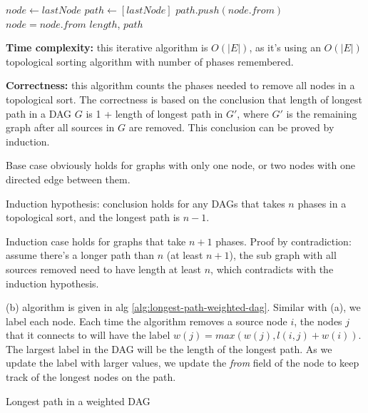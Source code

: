 \documentclass{article}
\begin{document}
\begin{description}
\begin{algorithm}[h]
\begin{algorithmic}[1]
      \State $node \gets lastNode$
      \State $path \gets [lastNode]$
        \State $path.push(node.from)$
        \State $node = node.from$
      \EndWhile
      \State \Return $length$, $path$
    \EndFunction
    
    \end{algorithmic}
  \end{algorithm}

  \textbf{Time complexity:} this iterative algorithm is $O(|E|)$, as it's using an $O(|E|)$ topological sorting algorithm with number of phases remembered. 

  \textbf{Correctness:} this algorithm counts the phases needed to remove all nodes in a topological sort. The correctness is based on the conclusion that length of longest path in a DAG $G$ is 1 + length of longest path in $G'$, where $G'$ is the remaining graph after all sources in $G$ are removed. This conclusion can be proved by induction.

  Base case obviously holds for graphs with only one node, or two nodes with one directed edge between them.

  Induction hypothesis: conclusion holds for any DAGs that takes $n$ phases in a topological sort, and the longest path is $n-1$.

  Induction case holds for graphs that take $n+1$ phases. Proof by contradiction: assume there's a longer path than $n$ (at least $n+1$), the sub graph with all sources removed need to have length at least $n$, which contradicts with the induction hypothesis.

  (b) algorithm is given in alg \ref{alg:longest-path-weighted-dag}. Similar with (a), we label each node. Each time the algorithm removes a source node $i$, the nodes $j$ that it connects to will have the label $w(j) = max(w(j), l(i,j) + w(i))$. The largest label in the DAG will be the length of the longest path. As we update the label with larger values, we update the \textit{from} field of the node to keep track of the longest nodes on the path.

  \begin{algorithm}[h]
  \caption{Longest path in a weighted DAG}
  \label{alg:longest-path-weighted-dag}
    \begin{algorithmic}[1]
  

\end{algorithmic}
\end{algorithm}
\end{description}
\end{document}
